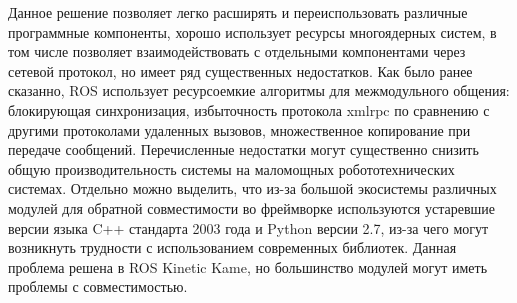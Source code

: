 Данное решение позволяет легко расширять и переиспользовать различные 
программные компоненты, хорошо использует ресурсы многоядерных систем, в том 
числе позволяет взаимодействовать с отдельными компонентами через сетевой 
протокол, но имеет ряд существенных недостатков. Как было ранее сказанно, ROS 
использует ресурсоемкие алгоритмы для межмодульного общения: блокирующая 
синхронизация, избыточность протокола xmlrpc по сравнению с другими протоколами 
удаленных вызовов, множественное копирование при передаче сообщений. 
Перечисленные недостатки могут существенно снизить общую производительность 
системы на маломощных робототехнических системах. Отдельно можно выделить, что 
из-за большой экосистемы различных модулей для обратной совместимости во 
фреймворке используются устаревшие версии языка C++ стандарта 2003 года и 
Python версии 2.7, из-за чего могут возникнуть трудности с использованием 
современных библиотек. Данная проблема решена в ROS Kinetic Kame, но 
большинство модулей могут иметь проблемы с совместимостью.


